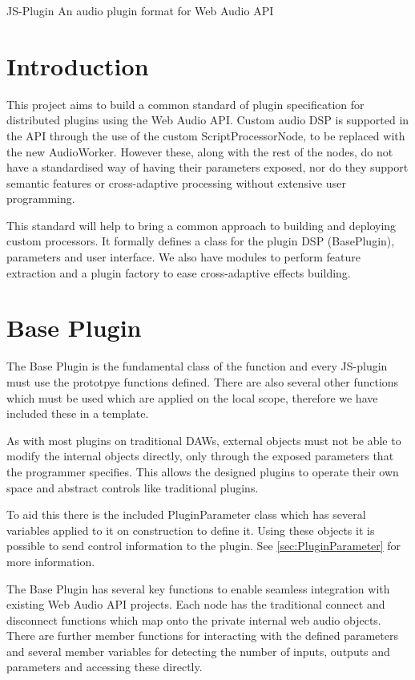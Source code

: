 \documentclass{article}
\begin{document}
\large JS-Plugin
\large An audio plugin format for Web Audio API

\section{Introduction}

This project aims to build a common standard of plugin specification for distributed plugins using the Web Audio API. Custom audio DSP is supported in the API through the use of the custom ScriptProcessorNode, to be replaced with the new AudioWorker. However these, along with the rest of the nodes, do not have a standardised way of having their parameters exposed, nor do they support semantic features or cross-adaptive processing without extensive user programming.

This standard will help to bring a common approach to building and deploying custom processors. It formally defines a class for the plugin DSP (BasePlugin), parameters and user interface. We also have modules to perform feature extraction and a plugin factory to ease cross-adaptive effects building.

\section{Base Plugin}

The Base Plugin is the fundamental class of the function and every JS-plugin must use the prototpye functions defined. There are also several other functions which must be used which are applied on the local scope, therefore we have included these in a template.

As with most plugins on traditional DAWs, external objects must not be able to modify the internal objects directly, only through the exposed parameters that the programmer specifies. This allows the designed plugins to operate their own space and abstract controls like traditional plugins.

To aid this there is the included PluginParameter class which has several variables applied to it on construction to define it. Using these objects it is possible to send control information to the plugin. See \ref{sec:PluginParameter} for more information.

The Base Plugin has several key functions to enable seamless integration with existing Web Audio API projects. Each node has the traditional connect and disconnect functions which map onto the private internal web audio objects. There are further member functions for interacting with the defined parameters and several member variables for detecting the number of inputs, outputs and parameters and accessing these directly.
\end{document}
